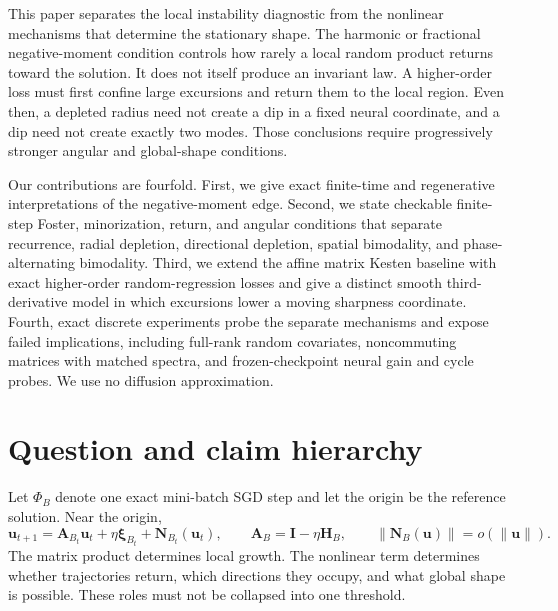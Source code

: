 \documentclass[10pt]{article}
\theoremstyle{definition}
\theoremstyle{remark}
\newcommand{\norm}[1]{\left\lVert#1\right\rVert}
\newcommand{\Id}{\mathbf I}
\newcommand{\uvec}{\mathbf u}
\newcommand{\Hvec}{\mathbf H}
\newcommand{\Avec}{\mathbf A}
\newcommand{\xivec}{\boldsymbol\xi}
\begin{document}
This paper separates the local instability diagnostic from the nonlinear
mechanisms that determine the stationary shape.  The harmonic or fractional
negative-moment condition controls how rarely a local random product returns
toward the solution.  It does not itself produce an invariant law.  A
higher-order loss must first confine large excursions and return them to the
local region.  Even then, a depleted radius need not create a dip in a fixed
neural coordinate, and a dip need not create exactly two modes.  Those
conclusions require progressively stronger angular and global-shape
conditions.

Our contributions are fourfold.  First, we give exact finite-time and
regenerative interpretations of the negative-moment edge.  Second, we state
checkable finite-step Foster, minorization, return, and angular conditions
that separate recurrence, radial depletion, directional depletion, spatial
bimodality, and phase-alternating bimodality.  Third, we extend the affine
matrix Kesten baseline with exact higher-order random-regression losses and
give a distinct smooth third-derivative model in which excursions lower a
moving sharpness coordinate.  Fourth, exact discrete experiments probe the
separate mechanisms and expose failed implications, including full-rank
random covariates, noncommuting
matrices with matched spectra, and frozen-checkpoint neural gain and cycle
probes.  We use no diffusion approximation.

\section{Question and claim hierarchy}

Let $\Phi_B$ denote one exact mini-batch SGD step and let the origin be the
reference solution.  Near the origin,
\begin{equation}
  \uvec_{t+1}=\Avec_{B_t}\uvec_t+\eta\xivec_{B_t}+\mathbf N_{B_t}(\uvec_t),
  \qquad \Avec_B=\Id-\eta\Hvec_B,
  \qquad \norm{\mathbf N_B(\uvec)}=o(\norm{\uvec}).
  \label{eq:local-map}
\end{equation}
The matrix product determines local growth.  The nonlinear term determines
whether trajectories return, which directions they occupy, and what global
shape is possible.  These roles must not be collapsed into one threshold.
\end{document}
